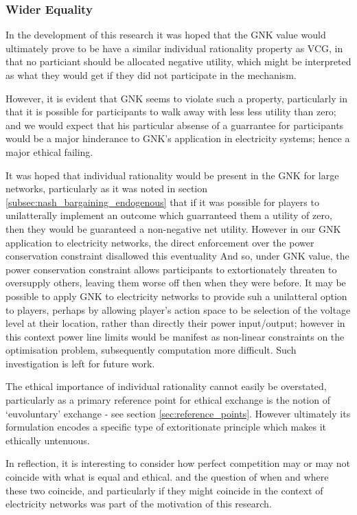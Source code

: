 \subsubsection*{Wider Equality}

In the development of this research it was hoped that the GNK value would ultimately prove to be have a similar individual rationality property as VCG, in that no particiant should be allocated negative utility, which might be interpreted as what they would get if they did not participate in the mechanism.

However, it is evident that GNK seems to violate such a property, particularly in that it is possible for participants to walk away with less less utility than zero; and we would expect that his particular absense of a guarrantee for participants would be a major hinderance to GNK's application in electricity systems; hence a major ethical failing.

It was hoped that individual rationality would be present in the GNK for large networks, particularly as it was noted in section \ref{subsec:nash_bargaining_endogenous} that if it was possible for players to unilatterally implement an outcome which guarranteed them a utility of zero, then they would be guaranteed a non-negative net utility.
However in our GNK application to electricity networks, the direct enforcement over the power conservation constraint disallowed this eventuality
And so, under GNK value, the power conservation constraint allows participants to extortionately threaten to oversupply others, leaving them worse off then when they were before.
It may be possible to apply GNK to electricity networks to provide suh a unilatteral option to players, perhaps by allowing player's action space to be selection of the voltage level at their location, rather than directly their power input/output; however in this context power line limits would be manifest as non-linear constraints on the optimisation problem, subsequently computation more difficult.
Such investigation is left for future work.

The ethical importance of individual rationality cannot easily be overstated, particularly as a primary reference point for ethical exchange is the notion of `euvoluntary' exchange - see section \ref{sec:reference_points}.
However ultimately its formulation encodes a specific type of extoritionate principle which makes it ethically untenuous.

In reflection, it is interesting to consider  how perfect competition may or may not coincide with what is equal and ethical.
and the question of when and where these two coincide, and particularly if they might coincide in the context of electricity networks was part of the motivation of this research.

